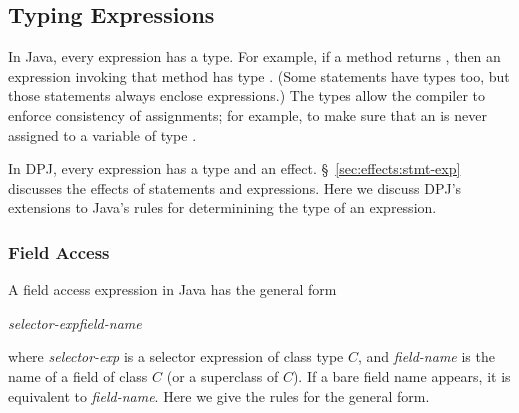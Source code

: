 \subsection{Typing Expressions%
\label{sec:types:exp}}

In Java, every expression has a type.  For example, if a method
returns , then an expression invoking that method has type
.  (Some statements have types too, but those statements
always enclose expressions.)  The types allow the compiler to enforce
consistency of assignments; for example, to make sure that an
 is never assigned to a variable of type .

In DPJ, every expression has a type and an effect.
\S~\ref{sec:effects:stmt-exp} discusses the effects of statements and
expressions.  Here we discuss DPJ's extensions to Java's rules for
determinining the type of an expression.

\subsubsection{Field Access%
\label{sec:types:exp:field}}

A field access expression in Java has the general form
%
\begin{description}
\item \emph{selector-exp}\emph{field-name}
\end{description}
%
where \emph{selector-exp} is a selector expression of class type $C$,
and \emph{field-name} is the name of a field of class $C$ (or a
superclass of $C$).  If a bare field name appears, it is equivalent to
\emph{field-name}.  Here we give the rules for the general
form.

